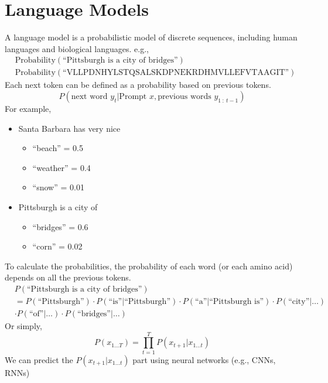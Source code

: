 \documentclass[10pt]{article}
\begin{document}
\section*{Language Models}
A language model is a probabilistic model of discrete sequences, including human languages and biological languages.  e.g.,
\begin{align*}
    &\text{Probability}(\text{``Pittsburgh is a city of bridges''})\\
    &\text{Probability}(\text{``VLLPDNHYLSTQSALSKDPNEKRDHMVLLEFVTAAGIT''})
\end{align*}
Each next token can be defined as a probability based on previous tokens.
\[P(\text{next word } y_t | \text{Prompt } x, \text{previous words } y_{1\::\: t - 1})\]
For example,
\begin{itemize}
	\item Santa Barbara has very nice \underline{\hspace{2cm}}
	\begin{itemize}
	    \item ``beach'' = 0.5 
	    \item ``weather'' = 0.4
	    \item ``snow'' = 0.01
    \end{itemize}
    \item Pittsburgh is a city of \underline{\hspace{2cm}}
    \begin{itemize}
	    \item ``bridges'' = 0.6
	    \item ``corn'' = 0.02
    \end{itemize}
\end{itemize}
To calculate the probabilities, the probability of each word (or each amino acid) depends on all the previous tokens.
\begin{align*}
    &P(\text{``Pittsburgh is a city of bridges''}) \\
    &= P(\text{``Pittsburgh''}) \cdot P(\text{``is''} | \text{``Pittsburgh''}) \cdot P(\text{``a''} | \text{``Pittsburgh is''}) \cdot P(\text{``city''} | \dots) \\
    &\cdot P(\text{``of''} | \dots) \cdot P(\text{``bridges''} | \dots)
\end{align*}
Or simply,
\[P(x_{1\dots T}) = \prod_{t = 1}^T P(x_{t + 1} | x_{1\dots t})\]
We can predict the $P(x_{t + 1} | x_{1 \dots t})$ part using neural networks (e.g., CNNs, RNNs)
\end{document}
